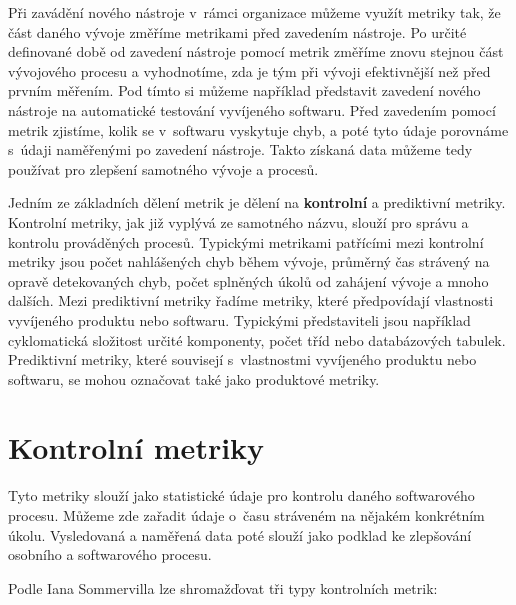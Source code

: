 \documentclass[czech,master]{diploma}
\begin{document}
Při zavádění nového nástroje v~rámci organizace můžeme využít metriky tak, že část daného vývoje změříme metrikami před zavedením nástroje. Po určité definované době od zavedení nástroje pomocí metrik změříme znovu stejnou část vývojového procesu a vyhodnotíme, zda je tým při vývoji efektivnější než před prvním měřením. Pod tímto si můžeme například představit zavedení nového nástroje na automatické testování vyvíjeného softwaru. Před zavedením pomocí metrik zjistíme, kolik se v~softwaru vyskytuje chyb, a poté tyto údaje porovnáme s~údaji naměřenými po zavedení nástroje. Takto získaná data můžeme tedy používat pro zlepšení samotného vývoje a procesů.

Jedním ze základních dělení metrik je dělení na \textbf{kontrolní} a prediktivní metriky. Kontrolní metriky, jak již vyplývá ze samotného názvu, slouží pro správu a kontrolu prováděných procesů. Typickými metrikami patřícími mezi kontrolní metriky jsou počet nahlášených chyb během vývoje, průměrný čas strávený na opravě detekovaných chyb, počet splněných úkolů od zahájení vývoje a mnoho dalších. Mezi prediktivní metriky řadíme metriky, které předpovídají vlastnosti vyvíjeného produktu nebo softwaru. Typickými představiteli jsou například cyklomatická složitost určité komponenty, počet tříd nebo databázových tabulek. Prediktivní metriky, které souvisejí s~vlastnostmi vyvíjeného produktu nebo softwaru, se mohou označovat také jako produktové metriky. \cite{ref:metric_definition}

\section{Kontrolní metriky}
Tyto metriky slouží jako statistické údaje pro kontrolu daného softwarového procesu. Můžeme zde zařadit údaje o~času stráveném na nějakém konkrétním úkolu. Vysledovaná a naměřená data poté slouží jako podklad ke zlepšování osobního a softwarového procesu.

Podle Iana Sommervilla \cite{ref:kontrolni_metriky} lze shromažďovat tři typy kontrolních metrik:
\end{document}
